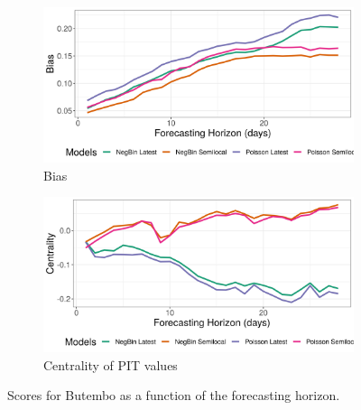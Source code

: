 \begin{figure}[H]
\begin{subfigure}{0.5\textwidth}
  \centering
  \includegraphics[width=\linewidth]{../output/Butembo_bias.png}  
  \caption{Bias}
  \label{fig:Butembo_scores_3}
\end{subfigure}
\begin{subfigure}{0.5\textwidth}
  \centering
  \includegraphics[width=\linewidth]{../output/Butembo_centrality.png}  
  \caption{Centrality of PIT values}
  \label{fig:Butembo_scores_4}
\end{subfigure}
  \caption{Scores for Butembo as a function of the forecasting horizon.}

  \label{fig:nat_scores}
\end{figure}
